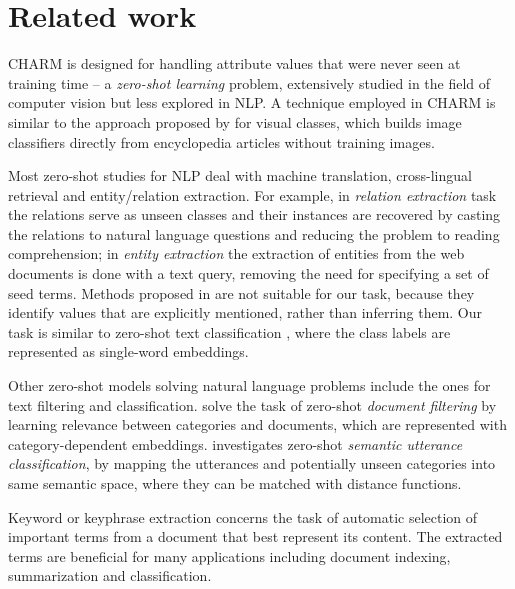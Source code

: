 
\section{Related work}

CHARM 
is designed for handling attribute values
that were never seen at training time -- a \emph{zero-shot learning} problem, extensively studied in the field of computer vision but less explored in NLP. A technique employed in CHARM is similar to the approach proposed by \citet{zero-shot15} for visual classes, which
builds image classifiers directly from
encyclopedia articles  
without
training images.

Most zero-shot studies for NLP \cite{wang2019survey} deal with machine translation, cross-lingual retrieval and entity/relation extraction. For example, in \textit{relation extraction} task \cite{levy2017zero} the relations serve as unseen classes and their instances are recovered by casting the relations to natural language questions and reducing the problem to reading comprehension; in \textit{entity extraction} \cite{pasupat2014zero} the extraction of entities from the web documents is done with a text query, removing the need for specifying a set of seed terms. Methods proposed in \cite{levy2017zero, pasupat2014zero} are not suitable for our task, because they identify values that are explicitly mentioned, rather than inferring them. Our task is similar to zero-shot text classification \cite{yazdani2015model, zhang2019integrating}, where the class labels are represented as single-word embeddings.

Other zero-shot models solving natural language problems include the ones for text filtering and classification. \citet{li2018deep} solve the task of zero-shot \textit{document filtering} by learning relevance between categories and documents, which are represented with category-dependent embeddings. \citet{dauphin2013zero} investigates zero-shot \textit{semantic utterance classification}, by mapping the utterances and potentially unseen categories into same semantic space, where they can be matched with distance functions.

Keyword or keyphrase extraction concerns the task of automatic selection of important terms from a document that best represent its content. The extracted terms are beneficial for many applications including document indexing, summarization and classification. 

